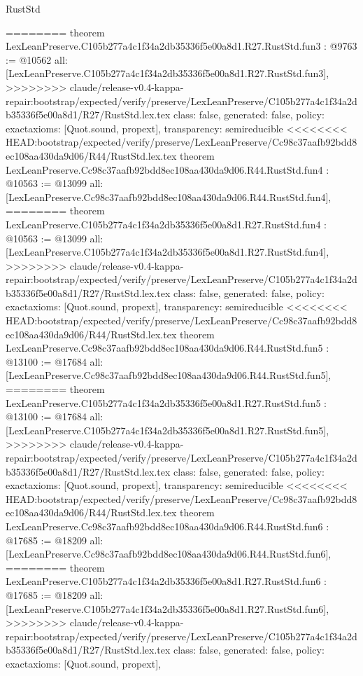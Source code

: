 \begin{lexlean}{RustStd}
\begin{coremodule}
{\begin{coremodule}
{{{{{{========
theorem LexLeanPreserve.C105b277a4c1f34a2db35336f5e00a8d1.R27.RustStd.fun3 : @9763 := @10562 {
  all: [LexLeanPreserve.C105b277a4c1f34a2db35336f5e00a8d1.R27.RustStd.fun3],
>>>>>>>> claude/release-v0.4-kappa-repair:bootstrap/expected/verify/preserve/LexLeanPreserve/C105b277a4c1f34a2db35336f5e00a8d1/R27/RustStd.lex.tex
  class: false,
  generated: false,
  policy: exact{axioms: [Quot.sound, propext]},
  transparency: semireducible
}
<<<<<<<< HEAD:bootstrap/expected/verify/preserve/LexLeanPreserve/Cc98c37aafb92bdd8ec108aa430da9d06/R44/RustStd.lex.tex
theorem LexLeanPreserve.Cc98c37aafb92bdd8ec108aa430da9d06.R44.RustStd.fun4 : @10563 := @13099 {
  all: [LexLeanPreserve.Cc98c37aafb92bdd8ec108aa430da9d06.R44.RustStd.fun4],
========
theorem LexLeanPreserve.C105b277a4c1f34a2db35336f5e00a8d1.R27.RustStd.fun4 : @10563 := @13099 {
  all: [LexLeanPreserve.C105b277a4c1f34a2db35336f5e00a8d1.R27.RustStd.fun4],
>>>>>>>> claude/release-v0.4-kappa-repair:bootstrap/expected/verify/preserve/LexLeanPreserve/C105b277a4c1f34a2db35336f5e00a8d1/R27/RustStd.lex.tex
  class: false,
  generated: false,
  policy: exact{axioms: [Quot.sound, propext]},
  transparency: semireducible
}
<<<<<<<< HEAD:bootstrap/expected/verify/preserve/LexLeanPreserve/Cc98c37aafb92bdd8ec108aa430da9d06/R44/RustStd.lex.tex
theorem LexLeanPreserve.Cc98c37aafb92bdd8ec108aa430da9d06.R44.RustStd.fun5 : @13100 := @17684 {
  all: [LexLeanPreserve.Cc98c37aafb92bdd8ec108aa430da9d06.R44.RustStd.fun5],
========
theorem LexLeanPreserve.C105b277a4c1f34a2db35336f5e00a8d1.R27.RustStd.fun5 : @13100 := @17684 {
  all: [LexLeanPreserve.C105b277a4c1f34a2db35336f5e00a8d1.R27.RustStd.fun5],
>>>>>>>> claude/release-v0.4-kappa-repair:bootstrap/expected/verify/preserve/LexLeanPreserve/C105b277a4c1f34a2db35336f5e00a8d1/R27/RustStd.lex.tex
  class: false,
  generated: false,
  policy: exact{axioms: [Quot.sound, propext]},
  transparency: semireducible
}
<<<<<<<< HEAD:bootstrap/expected/verify/preserve/LexLeanPreserve/Cc98c37aafb92bdd8ec108aa430da9d06/R44/RustStd.lex.tex
theorem LexLeanPreserve.Cc98c37aafb92bdd8ec108aa430da9d06.R44.RustStd.fun6 : @17685 := @18209 {
  all: [LexLeanPreserve.Cc98c37aafb92bdd8ec108aa430da9d06.R44.RustStd.fun6],
========
theorem LexLeanPreserve.C105b277a4c1f34a2db35336f5e00a8d1.R27.RustStd.fun6 : @17685 := @18209 {
  all: [LexLeanPreserve.C105b277a4c1f34a2db35336f5e00a8d1.R27.RustStd.fun6],
>>>>>>>> claude/release-v0.4-kappa-repair:bootstrap/expected/verify/preserve/LexLeanPreserve/C105b277a4c1f34a2db35336f5e00a8d1/R27/RustStd.lex.tex
  class: false,
  generated: false,
  policy: exact{axioms: [Quot.sound, propext]},
}}}}}}}}}}
\end{coremodule}}
\end{coremodule}
\end{lexlean}
